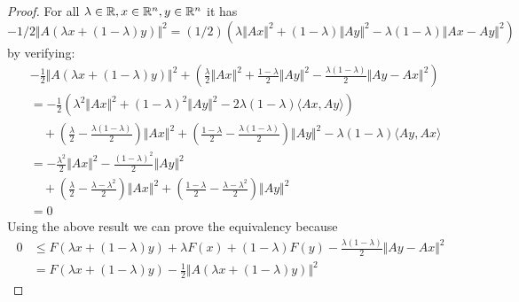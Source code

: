\documentclass[12pt]{article}
\begin{document}
            \begin{proof}
                For all $\lambda \in \mathbb R, x \in \mathbb R^n, y \in \mathbb R^n$ it has $-1/2\Vert A(\lambda x + (1 - \lambda)y)\Vert^2 = (1/2)(\lambda\Vert Ax\Vert^2 + (1 - \lambda)\Vert Ay\Vert^2 - \lambda(1 - \lambda)\Vert Ax - Ay\Vert^2)$ by verifying: 
                \begin{align*}
                    & -\frac{1}{2}\Vert A(\lambda x + (1 - \lambda)y)\Vert^2 + 
                    \left(
                        \frac{\lambda}{2}\Vert Ax\Vert^2 + \frac{1 - \lambda}{2}\Vert Ay\Vert^2 - \frac{\lambda(1 - \lambda)}{2}\Vert Ay - Ax\Vert^2
                    \right)
                    \\
                    &= 
                    -\frac{1}{2}\left(
                        \lambda^2\Vert Ax\Vert^2 + (1 - \lambda)^2\Vert Ay\Vert^2 - 2\lambda(1 - \lambda) \langle Ax, Ay\rangle
                    \right)
                        \\ &\quad 
                        + 
                        \left(
                            \frac{\lambda}{2} - \frac{\lambda(1 - \lambda)}{2}
                        \right)\Vert Ax\Vert^2 + \left(
                            \frac{1 - \lambda}{2} - \frac{\lambda(1 - \lambda)}{2}
                        \right)\Vert Ay\Vert^2 - \lambda(1 - \lambda)\langle Ay, Ax\rangle
                    \\
                    &= - \frac{\lambda^2}{2}\Vert Ax\Vert^2 - \frac{(1 - \lambda)^2}{2}\Vert Ay\Vert^2
                        \\ &\quad 
                        + 
                        \left(
                            \frac{\lambda}{2} - \frac{\lambda - \lambda^2}{2}
                        \right)\Vert Ax\Vert^2 + \left(
                            \frac{1 - \lambda}{2} - \frac{\lambda - \lambda^2}{2}
                        \right)\Vert Ay\Vert^2
                    \\
                    &= 0
                \end{align*}
                Using the above result we can prove the equivalency because 
                {\small
                \begin{align*}
                    0 &\le F(\lambda x + (1 - \lambda)y) + \lambda F(x) + (1 - \lambda)F(y) -\frac{\lambda(1 - \lambda)}{2} \Vert Ay - Ax\Vert^2
                    \\
                    &=  F(\lambda x + (1 - \lambda)y) - \frac{1}{2}\Vert A(\lambda x + (1 - \lambda)y)\Vert^2 

\end{align*}}
\end{proof}
\end{document}

